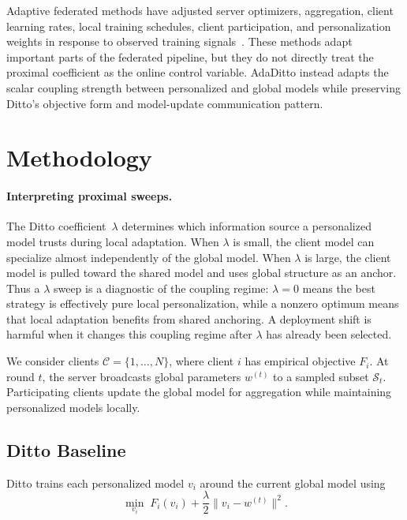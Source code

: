 \documentclass[letterpaper]{article} %
\begin{document}
Adaptive federated methods have adjusted server optimizers,
aggregation, client learning rates, local training schedules, client
participation, and personalization weights in response to observed
training signals~\cite{reddi2021adaptive,kim2024adaptive,sun2023fedlalr,wu2023faster,shenaj2025adaptive,deng2020adaptive}.
These methods adapt important parts of the federated pipeline, but they
do not directly treat the proximal coefficient as the online control
variable. AdaDitto instead adapts the scalar coupling strength between
personalized and global models while preserving Ditto's objective form
and model-update communication pattern.

\section{Methodology}
\label{sec:methodology}

\paragraph{Interpreting proximal sweeps.}
The Ditto coefficient~$\lambda$ determines which information source a
personalized model trusts during local adaptation. When $\lambda$ is
small, the client model can specialize almost independently of the
global model. When $\lambda$ is large, the client model is pulled
toward the shared model and uses global structure as an anchor. Thus
a $\lambda$ sweep is a diagnostic of the coupling regime:
$\lambda=0$ means the best strategy is effectively pure local
personalization, while a nonzero optimum means that local adaptation
benefits from shared anchoring. A deployment shift is harmful when it
changes this coupling regime after $\lambda$ has already been
selected.

We consider clients $\mathcal{C}=\{1,\dots,N\}$, where client $i$ has empirical objective $F_i$. At round $t$, the server broadcasts global parameters $w^{(t)}$ to a sampled subset $\mathcal{S}_t$. Participating clients update the global model for aggregation while maintaining personalized models locally.

\subsection{Ditto Baseline}

Ditto trains each personalized model $v_i$ around the current global model using
\begin{equation}
\label{eq:ditto_obj}
\min_{v_i}\; F_i(v_i) + \frac{\lambda}{2}\|v_i-w^{(t)}\|^2.
\end{equation}
\end{document}
